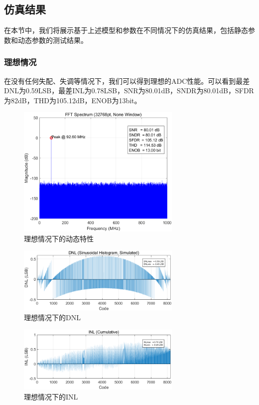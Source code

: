 \documentclass[cs4size,a4paper]{ctexart}
\numberwithin{equation}{section}
\numberwithin{table}{section}
\numberwithin{figure}{section}
\begin{document}
	\subsection{仿真结果}
	在本节中，我们将展示基于上述模型和参数在不同情况下的仿真结果，包括静态参数和动态参数的测试结果。
	\subsubsection{理想情况}
	在没有任何失配、失调等情况下，我们可以得到理想的ADC性能。可以看到最差DNL为0.59LSB，最差INL为0.78LSB，SNR为80.01dB，SNDR为80.01dB，SFDR为82dB，THD为105.12dB，ENOB为13bit。
		\begin{figure}[H]
			\centering
			\includegraphics[width=0.7\textwidth]{pic/ideal/DFT.png}
			\caption{理想情况下的动态特性} 
		\end{figure}

		\begin{figure}[H]
			\centering
			\includegraphics[width=0.7\textwidth]{pic/ideal/DNL.png}
			\caption{理想情况下的DNL} 
		\end{figure}

		\begin{figure}[H]
			\centering
			\includegraphics[width=0.7\textwidth]{pic/ideal/INL.png}
			\caption{理想情况下的INL} 
		\end{figure}
\end{document}
